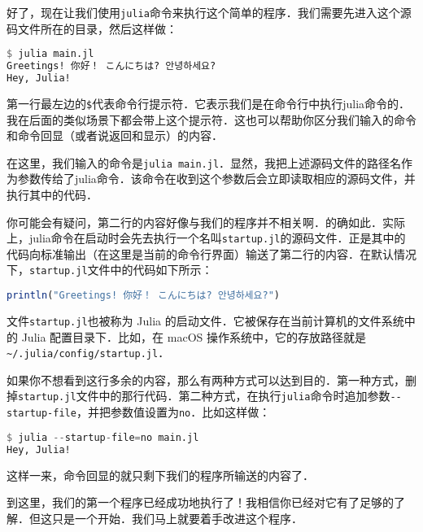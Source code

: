 好了，现在让我们使用\verb|julia|命令来执行这个简单的程序．我们需要先进入这个源码文件所在的目录，然后这样做：
\begin{lstlisting}[language=julia]
$ julia main.jl 
Greetings! 你好！ こんにちは? 안녕하세요?
Hey, Julia!
\end{lstlisting}

第一行最左边的\verb|$|代表命令行提示符．它表示我们是在命令行中执行julia命令的．我在后面的类似场景下都会带上这个提示符．这也可以帮助你区分我们输入的命令和命令回显（或者说返回和显示）的内容．

在这里，我们输入的命令是\verb|julia main.jl|．显然，我把上述源码文件的路径名作为参数传给了julia命令．该命令在收到这个参数后会立即读取相应的源码文件，并执行其中的代码．

你可能会有疑问，第二行的内容好像与我们的程序并不相关啊．的确如此．实际上，julia命令在启动时会先去执行一个名叫\verb|startup.jl|的源码文件．正是其中的代码向标准输出（在这里是当前的命令行界面）输送了第二行的内容．在默认情况下，\verb|startup.jl|文件中的代码如下所示：
\begin{lstlisting}[language=julia]
println("Greetings! 你好！ こんにちは? 안녕하세요?")
\end{lstlisting}

文件\verb|startup.jl|也被称为 Julia 的启动文件．它被保存在当前计算机的文件系统中的 Julia 配置目录下．比如，在 macOS 操作系统中，它的存放路径就是\verb|~/.julia/config/startup.jl|．

如果你不想看到这行多余的内容，那么有两种方式可以达到目的．第一种方式，删掉\verb|startup.jl|文件中的那行代码．第二种方式，在执行\verb|julia|命令时追加参数\verb|--startup-file|，并把参数值设置为\verb|no|．比如这样做：
\begin{lstlisting}[language=julia]
$ julia --startup-file=no main.jl
Hey, Julia!
\end{lstlisting}
这样一来，命令回显的就只剩下我们的程序所输送的内容了．

到这里，我们的第一个程序已经成功地执行了！我相信你已经对它有了足够的了解．但这只是一个开始．我们马上就要着手改进这个程序．